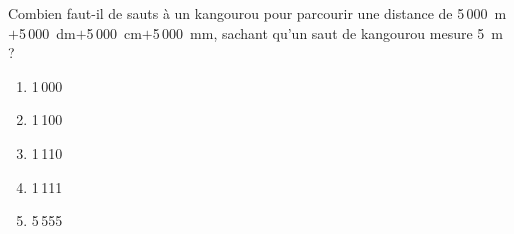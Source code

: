 Combien faut-il de sauts à un kangourou pour parcourir une distance de 5\,000~m$+$5\,000~dm$+$5\,000~cm$+$5\,000~mm, sachant qu'un saut de kangourou mesure 5~m ?
\begin{multicols}{5}
  \begin{enumerate}[A/]
  \item 1\,000
  \item 1\,100
  \item 1\,110
  \item 1\,111
  \item 5\,555
  \end{enumerate}
\end{multicols}